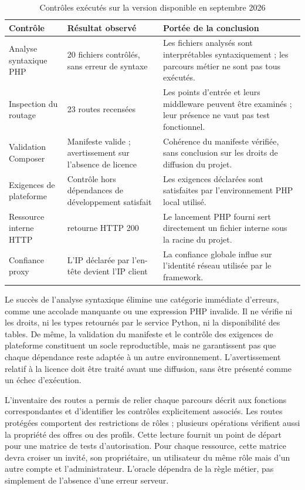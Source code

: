 \begin{table}[htbp]
\centering
\small
\caption{Contrôles exécutés sur la version disponible en septembre 2026}
\label{tab:validation-outillage}
\begin{tabularx}{\textwidth}{@{}P{0.26\textwidth}P{0.26\textwidth}X@{}}
\toprule
Contrôle & Résultat observé & Portée de la conclusion \\
\midrule
Analyse syntaxique PHP & 20 fichiers contrôlés, sans erreur de syntaxe & Les fichiers analysés sont interprétables syntaxiquement ; les parcours métier ne sont pas tous exécutés. \\
Inspection du routage & 23 routes recensées & Les points d'entrée et leurs middleware peuvent être examinés ; leur présence ne vaut pas test fonctionnel. \\
Validation Composer & Manifeste valide ; avertissement sur l'absence de licence & Cohérence du manifeste vérifiée, sans conclusion sur les droits de diffusion du projet. \\
Exigences de plateforme & Contrôle hors dépendances de développement satisfait & Les exigences déclarées sont satisfaites par l'environnement PHP local utilisé. \\
Ressource interne HTTP &  retourne HTTP 200 & Le lancement PHP fourni sert directement un fichier interne sous la racine du projet. \\
Confiance proxy & L'IP déclarée par l'en-tête devient l'IP client & La confiance globale influe sur l'identité réseau utilisée par le framework. \\
\bottomrule
\end{tabularx}
\end{table}

Le succès de l'analyse syntaxique élimine une catégorie immédiate d'erreurs, comme une accolade manquante ou une expression PHP invalide. Il ne vérifie ni les droits, ni les types retournés par le service Python, ni la disponibilité des tables. De même, la validation du manifeste et le contrôle des exigences de plateforme constituent un socle reproductible, mais ne garantissent pas que chaque dépendance reste adaptée à un autre environnement. L'avertissement relatif à la licence doit être traité avant une diffusion, sans être présenté comme un échec d'exécution.

L'inventaire des routes a permis de relier chaque parcours décrit aux fonctions correspondantes et d'identifier les contrôles explicitement associés. Les routes protégées comportent des restrictions de rôles ; plusieurs opérations vérifient aussi la propriété des offres ou des profils. Cette lecture fournit un point de départ pour une matrice de tests d'autorisation. Pour chaque ressource, cette matrice devra croiser un invité, son propriétaire, un utilisateur du même rôle mais d'un autre compte et l'administrateur. L'oracle dépendra de la règle métier, pas simplement de l'absence d'une erreur serveur.

